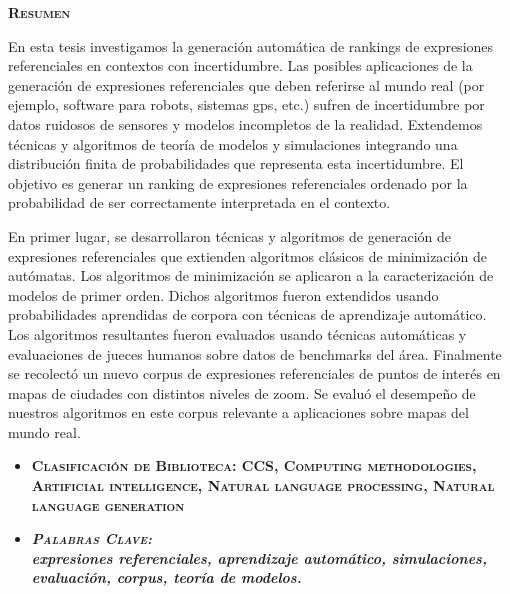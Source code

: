 \thispagestyle{empty}


\begin{center}

{ \vspace*{1cm} }
\huge{\textbf{\textsc{\textmd{Resumen}}}}\\[1cm]

\end{center}

\normalsize{


En esta tesis investigamos la generaci\'on autom\'atica de rankings de
expresiones referenciales en contextos con incertidumbre. Las
posibles aplicaciones de la generaci\'on de expresiones referenciales
que deben referirse al mundo real (por ejemplo, software para robots, sistemas
gps, etc.) sufren de incertidumbre por datos ruidosos de sensores y
modelos incompletos de la realidad. Extendemos t\'ecnicas y algoritmos
de teor\'ia de modelos y simulaciones integrando una distribuci\'on finita
de probabilidades que representa esta incertidumbre. El objetivo es
generar un ranking de expresiones referenciales ordenado por la
probabilidad de ser correctamente interpretada en el contexto. 

En primer lugar, se desarrollaron t\'ecnicas y algoritmos de generaci\'on de
expresiones referenciales que extienden algoritmos cl\'asicos de
minimizaci\'on de aut\'omatas. Los algoritmos de minimizaci\'on se aplicaron a la caracterizaci\'on de modelos de
primer orden. Dichos algoritmos fueron extendidos usando
probabilidades aprendidas de corpora con t\'ecnicas de aprendizaje
autom\'atico. Los algoritmos resultantes fueron evaluados usando
t\'ecnicas autom\'aticas y evaluaciones de jueces humanos sobre datos de
benchmarks del \'area. Finalmente se recolect\'o un nuevo corpus de
expresiones referenciales de puntos de inter\'es en mapas de ciudades
con distintos niveles de zoom. Se evalu\'o el desempe\~no de nuestros algoritmos en
este corpus relevante a aplicaciones sobre mapas del mundo real.
}

\begin{itemize}
	\item \textbf{\textsc{Clasificaci\'on de Biblioteca: CCS, Computing methodologies, Artificial intelligence, Natural language processing, Natural language generation}}
	\item \textbf{\emph{\textsc{Palabras Clave:} \\ expresiones referenciales, aprendizaje autom\'atico, simulaciones, evaluaci\'on, corpus, teor\'ia de modelos.}}
\end{itemize}

